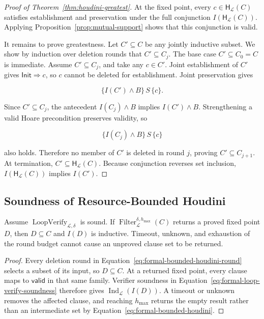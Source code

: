 \begin{proof}[Proof of Theorem~\ref{thm:houdini-greatest}]
At the fixed point, every \(c\in\mathsf H_{\mathcal L}(C)\) satisfies
establishment and preservation under the full conjunction
\(I(\mathsf H_{\mathcal L}(C))\).  Applying
Proposition~\ref{prop:mutual-support} shows that this conjunction is valid.

It remains to prove greatestness.  Let \(C'\subseteq C\) be any jointly
inductive subset.  We show by induction over deletion rounds that
\(C'\subseteq C_j\).  The base case \(C'\subseteq C_0=C\) is immediate.  Assume
\(C'\subseteq C_j\), and take any \(c\in C'\).  Joint establishment of \(C'\)
gives \(\mathsf{Init}\Rightarrow c\), so \(c\) cannot be deleted for establishment.  Joint
preservation gives

\[
  \{I(C')\wedge B\}\,S\,\{c\}.
\]

Since \(C'\subseteq C_j\), the antecedent \(I(C_j)\wedge B\) implies
\(I(C')\wedge B\).  Strengthening a valid Hoare precondition preserves
validity, so

\[
  \{I(C_j)\wedge B\}\,S\,\{c\}
\]

also holds.  Therefore no member of \(C'\) is deleted in round \(j\), proving
\(C'\subseteq C_{j+1}\).  At termination,
\(C'\subseteq\mathsf H_{\mathcal L}(C)\).  Because conjunction reverses set
inclusion, \(I(\mathsf H_{\mathcal L}(C))\) implies \(I(C')\).
\end{proof}

\subsection{Soundness of Resource-Bounded Houdini}

\begin{proposition}
\label{prop:bounded-houdini-sound}
Assume \(\operatorname{LoopVerify}_{\mathcal L,\delta}\) is sound.  If
\(\operatorname{Filter}_{\mathcal L}^{\delta,h_{\max}}(C)\) returns a proved
fixed point \(D\), then \(D\subseteq C\) and \(I(D)\) is inductive.  Timeout,
unknown, and exhaustion of the round budget cannot cause an unproved clause
set to be returned.
\end{proposition}

\begin{proof}
Every deletion round in Equation~\eqref{eq:formal-bounded-houdini-round}
selects a subset of its input, so \(D\subseteq C\).  At a returned fixed point,
every clause maps to \(\mathsf{valid}\) in that same family.  Verifier
soundness in Equation~\eqref{eq:formal-loop-verify-soundness} therefore gives
\(\operatorname{Ind}_{\mathcal L}(I(D))\).  A timeout or unknown removes the
affected clause, and reaching \(h_{\max}\) returns the empty result rather
than an intermediate set by Equation~\eqref{eq:formal-bounded-houdini}.
\end{proof}

